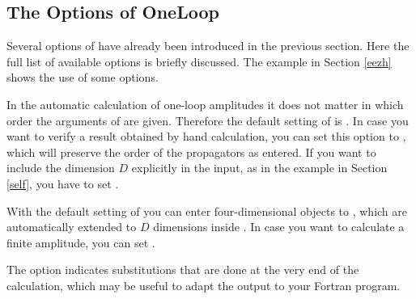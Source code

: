 \enom


\subsection{The Options of OneLoop}
\label{oneopt}
Several options of  have already been introduced in the previous
section.
Here the full list of available options is briefly discussed. 
The example  in Section \ref{eezh} shows the use of some options.

In the automatic calculation of one-loop amplitudes it does not matter in which order the 
arguments of  are given. Therefore the default setting of 
is . In case you want to verify a result obtained by hand calculation, you can set this 
option to , which will preserve the order of the propagators as entered.
If you want to include the dimension $D$ explicitly in the input, as in the example
in Section \ref{self}, you have to set .

With the default setting of  you can enter four-dimensional objects to 
, which are automatically extended to $D$ dimensions inside .
In case you want to calculate a finite amplitude, you can set .

The option  indicates substitutions that are done at the very end 
of the calculation, which may be useful to adapt the output to your Fortran program.

